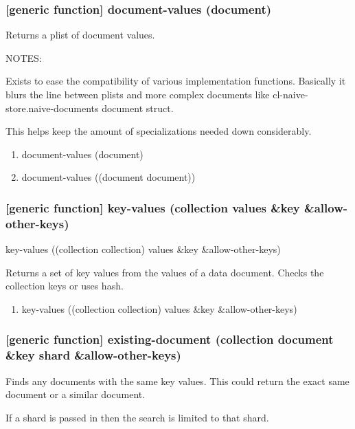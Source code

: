 \documentclass[11pt]{article}
\begin{document}
\subsubsection{[generic function] document-values (document)}
\label{sec:orgad4aff9}

Returns a plist of document values.

NOTES:

Exists to ease the compatibility of various implementation
functions. Basically it blurs the line between plists and more complex
documents like cl-naive-store.naive-documents document struct.

This helps keep the amount of specializations needed down
considerably.

\begin{enumerate}
\item document-values (document)
\label{sec:org9a31d8a}

\item document-values ((document document))
\label{sec:org5d33297}
\end{enumerate}

\subsubsection{[generic function] key-values (collection values \&key \&allow-other-keys)}
\label{sec:orgbc22bef}

key-values ((collection collection) values \&key \&allow-other-keys)

Returns a set of key values from the values of a data document. Checks
the collection keys or uses hash.

\begin{enumerate}
\item key-values ((collection collection) values \&key \&allow-other-keys)
\label{sec:org9801a02}
\end{enumerate}

\subsubsection{[generic function] existing-document (collection document \&key shard \&allow-other-keys)}
\label{sec:org10fd1cb}

Finds any documents with the same key values. This could return the
exact same document or a similar document.

If a shard is passed in then the search is limited to that shard.
\end{document}

